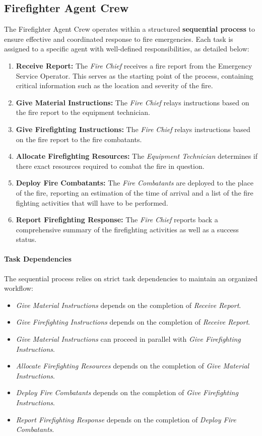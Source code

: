 \subsection{Firefighter Agent Crew}

The Firefighter Agent Crew operates within a structured \textbf{sequential process} to ensure effective and coordinated response to fire emergencies. Each task is assigned to a specific agent with well-defined responsibilities, as detailed below:

\begin{enumerate}
    \item \textbf{Receive Report:} The \textit{Fire Chief} receives a fire report from the Emergency Service Operator. This serves as the starting point of the process, containing critical information such as the location and severity of the fire.
    \item \textbf{Give Material Instructions:} The \textit{Fire Chief} relays instructions based on the fire report to the equipment technician.
    \item \textbf{Give Firefighting Instructions:} The \textit{Fire Chief} relays instructions based on the fire report to the fire combatants.
    \item \textbf{Allocate Firefighting Resources:} The \textit{Equipment Technician} determines if there exact resources required to combat the fire in question.
	\item \textbf{Deploy Fire Combatants:} The \textit{Fire Combatants} are deployed to the place of the fire, reporting an estimation of the time of arrival and a list of the fire fighting activities that will have to be performed.
	\item \textbf{Report Firefighting Response:} The \textit{Fire Chief} reports back a comprehensive summary of the firefighting activities as well as a success status.
\end{enumerate}

\paragraph{Task Dependencies}
The sequential process relies on strict task dependencies to maintain an organized workflow:
\begin{itemize}
    \item \textit{Give Material Instructions} depends on the completion of \textit{Receive Report}.
    \item \textit{Give Firefighting Instructions} depends on the completion of \textit{Receive Report}.
    \item \textit{Give Material Instructions} can proceed in parallel with \textit{Give Firefighting Instructions}.
    \item \textit{Allocate Firefighting Resources} depends on the completion of \textit{Give Material Instructions}.
    \item \textit{Deploy Fire Combatants} depends on the completion of \textit{Give Firefighting Instructions}.
    \item \textit{Report Firefighting Response} depends on the completion of \textit{Deploy Fire Combatants}.
\end{itemize}

